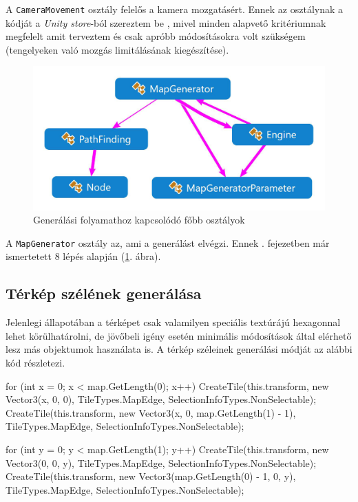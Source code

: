A \texttt{CameraMovement} osztály felelős a kamera mozgatásért. Ennek az osztálynak a kódját a \textit{Unity store}-ból szereztem be \cite{unitycamera}, mivel minden alapvető kritériumnak megfelelt amit terveztem és csak apróbb módosításokra volt szükségem (tengelyeken való mozgás limitálásának kiegészítése). 

\begin{figure}[h!]
\centering
\includegraphics[scale=0.3]{kepek/White_Generalas.JPG}
\caption{Generálási folyamathoz kapcsolódó főbb osztályok}
\label{fig:generalas}
\end{figure}

A \texttt{MapGenerator} osztály az, ami a generálást elvégzi. Ennek . fejezetben már ismertetett 8 lépés alapján (\ref{fig:generalas}. ábra).

\subsection{Térkép szélének generálása}

Jelenlegi állapotában a térképet csak valamilyen speciális textúrájú hexagonnal lehet körülhatárolni, de jövőbeli igény esetén minimális módosítások által elérhető lesz más objektumok használata is. A térkép széleinek generálási módját az alábbi kód részletezi.
\begin{cpp}
for (int x = 0; x < map.GetLength(0); x++)
{
   CreateTile(this.transform, new Vector3(x, 0, 0),
   TileTypes.MapEdge, SelectionInfoTypes.NonSelectable);
   CreateTile(this.transform, new Vector3(x, 0, map.GetLength(1) - 1),
   TileTypes.MapEdge, SelectionInfoTypes.NonSelectable);
}

for (int y = 0; y < map.GetLength(1); y++)
{
   CreateTile(this.transform, new Vector3(0, 0, y),
   TileTypes.MapEdge, SelectionInfoTypes.NonSelectable);
   CreateTile(this.transform, new Vector3(map.GetLength(0) - 1, 0, y),
   TileTypes.MapEdge, SelectionInfoTypes.NonSelectable);
}
\end{cpp}

